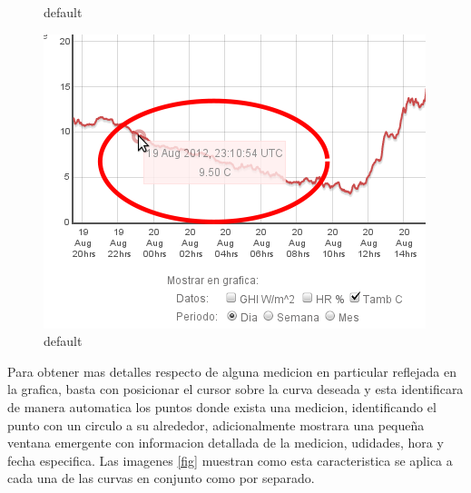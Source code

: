 \begin{figure}[ht]
\begin{minipage}[b]{0.45\linewidth}
                \caption{default}
                \label{fig:figure1}
        \end{minipage}
	\begin{minipage}[b]{0.45\linewidth}
                \centering
                \includegraphics[width=\textwidth]{./images/cap5chap1img4-3}
                \caption{default}
                \label{fig:figure1}
        \end{minipage}
\end{figure}
Para obtener mas detalles respecto de alguna medicion en particular reflejada en la grafica, basta con posicionar el cursor sobre la curva deseada y esta identificara de manera automatica los puntos donde exista una medicion, identificando el punto con un circulo a su alrededor, adicionalmente mostrara una pequeña ventana emergente con informacion detallada de la medicion, udidades, hora y fecha especifica. Las imagenes \ref{fig} muestran como esta caracteristica se aplica a cada una de las curvas en conjunto como por separado.

